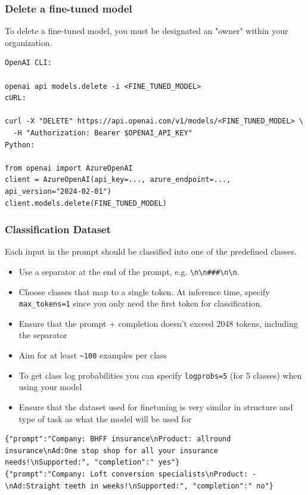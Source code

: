 \begin{frame}[fragile]\frametitle{Delete a fine-tuned model}

To delete a fine-tuned model, you must be designated an "owner" within your organization.

\begin{lstlisting}
OpenAI CLI:

openai api models.delete -i <FINE_TUNED_MODEL>
cURL:

curl -X "DELETE" https://api.openai.com/v1/models/<FINE_TUNED_MODEL> \
  -H "Authorization: Bearer $OPENAI_API_KEY"
Python:

from openai import AzureOpenAI
client = AzureOpenAI(api_key=..., azure_endpoint=..., api_version="2024-02-01")
client.models.delete(FINE_TUNED_MODEL)

\end{lstlisting}	

\end{frame}

\begin{frame}[fragile]\frametitle{Classification Dataset}

Each input in the prompt should be classified into one of the predefined classes. 
\begin{itemize}
\item Use a separator at the end of the prompt, e.g. \lstinline|\n\n###\n\n|. 
\item Choose classes that map to a single token. At inference time, specify  \lstinline|max_tokens=1| since you only need the first token for classification.
\item Ensure that the prompt + completion doesn't exceed 2048 tokens, including the separator
\item Aim for at least  \lstinline|~100| examples per class
\item To get class log probabilities you can specify \lstinline|logprobs=5| (for 5 classes) when using your model
\item Ensure that the dataset used for finetuning is very similar in structure and type of task as what the model will be used for
\end{itemize}	 


\begin{lstlisting}
{"prompt":"Company: BHFF insurance\nProduct: allround insurance\nAd:One stop shop for all your insurance needs!\nSupported:", "completion":" yes"}
{"prompt":"Company: Loft conversion specialists\nProduct: -\nAd:Straight teeth in weeks!\nSupported:", "completion":" no"}
\end{lstlisting}	
\end{frame}


